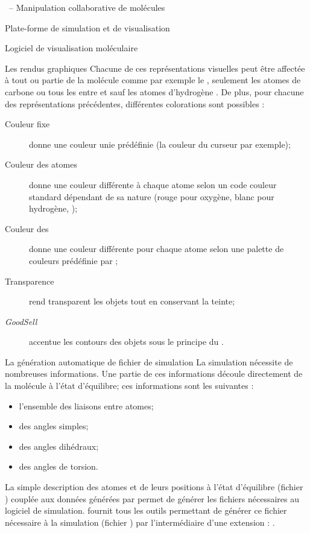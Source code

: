 \documentclass[myfrancais]{mythesis}
\begin{document}
\begin{mychapter}{\myShaddock\ -- Manipulation collaborative de molécules}
\begin{mysection}{Plate-forme de simulation et de visualisation}
\begin{mysubsection}{Logiciel de visualisation moléculaire}
\begin{mysubsubsection}{Les rendus graphiques}
					Chacune de ces représentations visuelles peut être affectée à tout ou partie de la molécule comme par exemple \og le   \fg, \og seulement les atomes de carbone \fg ou \og tous les  entre  et  sauf les atomes d'hydrogène \fg.
					De plus, pour chacune des représentations précédentes, différentes colorations sont possibles :
					\begin{description}
						\item[Couleur fixe] donne une couleur unie prédéfinie (la couleur du curseur par exemple);
						\item[Couleur des atomes] donne une couleur différente à chaque atome selon un code couleur standard dépendant de sa nature (rouge pour oxygène, blanc pour hydrogène, \myetc);
						\item[Couleur des ] donne une couleur différente pour chaque atome selon une palette de couleurs prédéfinie par ;
						\item[Transparence] rend transparent les objets tout en conservant la teinte;
						\item[\textit{GoodSell}] accentue les contours des objets sous le principe du .
					\end{description}
				\end{mysubsubsection}
				\begin{mysubsubsection}{La génération automatique de fichier de simulation}
					La simulation nécessite de nombreuses informations.
					Une partie de ces informations découle directement de la molécule à l'état d'équilibre; ces informations sont les suivantes :
					\begin{itemize}
						\item l'ensemble des liaisons entre atomes;
						\item des angles simples;
						\item des angles dihédraux;
						\item des angles de torsion.
					\end{itemize}
					La simple description des atomes et de leurs positions à l'état d'équilibre (fichier \myPDB) couplée aux données générées par \myCHARMM {} permet de générer les fichiers nécessaires au logiciel de simulation.
					 fournit tous les outils permettant de générer ce fichier nécessaire à la simulation (fichier \myPSF) par l'intermédiaire d'une extension : .

\end{mysubsubsection}
\end{mysubsection}
\end{mysection}
\end{mychapter}
\end{document}

